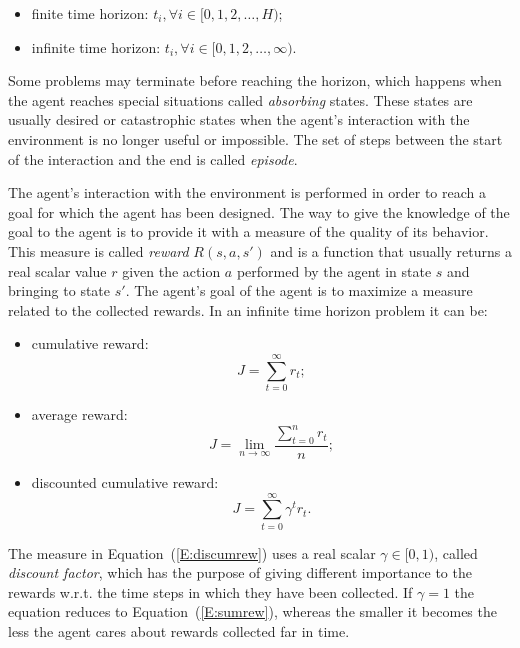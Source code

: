 \begin{itemize}
 \item finite time horizon: $t_i, \forall i \in [0, 1, 2, \dots, H)$;
 \item infinite time horizon: $t_i, \forall i \in [0, 1, 2, \dots, \infty)$.
\end{itemize}
Some problems may terminate before reaching the horizon, which happens when the agent reaches special situations called \textit{absorbing} states. These states are usually desired or catastrophic states when the agent's interaction with the environment is no longer useful or impossible. The set of steps between the start of the interaction and the end is called \textit{episode}.

The agent's interaction with the environment is performed in order to reach a goal for which the agent has been designed. The way to give the knowledge of the goal to the agent is to provide it with a measure of the quality of its behavior. This measure is called \textit{reward} $R(s,a,s')$ and is a function that usually returns a real scalar value $r$ given the action $a$ performed by the agent in state $s$ and bringing to state $s'$. The agent's goal of the agent is to maximize a measure related to the collected rewards. In an infinite time horizon problem it can be:
\begin{itemize}
 \item cumulative reward:
 \begin{equation}\label{E:sumrew}
  J = \sum_{t=0}^\infty r_t;
 \end{equation}
\item average reward:
\begin{equation}
 J = \lim_{n\to\infty}\dfrac{\sum_{t=0}^n r_t}{n};
\end{equation}
\item discounted cumulative reward:
\begin{equation}\label{E:discumrew}
 J = \sum_{t=0}^\infty \gamma^t r_t.
\end{equation}
\end{itemize}
The measure in Equation~(\ref{E:discumrew}) uses a real scalar $\gamma \in [0, 1)$, called \textit{discount factor}, which has the purpose of giving different importance to the rewards w.r.t. the time steps in which they have been collected. If $\gamma = 1$ the equation reduces to Equation~(\ref{E:sumrew}), whereas the smaller it becomes the less the agent cares about rewards collected far in time.

